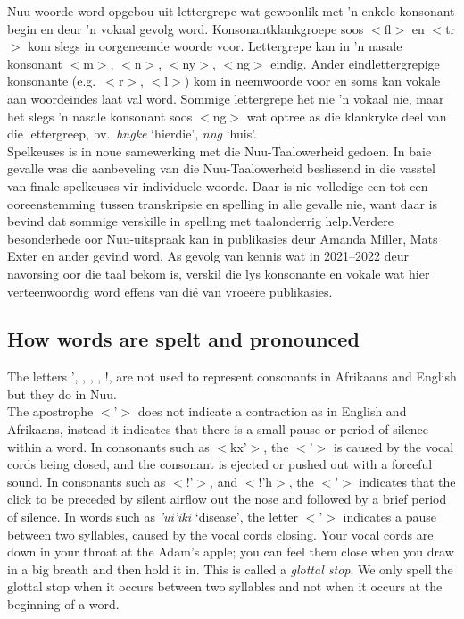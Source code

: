 N\textipa{\textvertline}uu-woorde word opgebou uit lettergrepe wat
gewoonlik met 'n enkele konsonant begin en deur 'n vokaal gevolg
word. Konsonantklankgroepe soos $<$fl$>$ en $<$tr$>$ kom slegs in
oorgeneemde woorde voor. Lettergrepe kan in 'n nasale konsonant
$<$m$>$, $<$n$>$, $<$ny$>$, $<$ng$>$ eindig. Ander eindlettergrepige
konsonante (e.g.\ $<$r$>$, $<$l$>$) kom in neemwoorde voor en soms kan
vokale aan woordeindes laat val word. Sommige lettergrepe het nie 'n
vokaal nie, maar het slegs 'n nasale konsonant soos $<$ng$>$ wat
optree as die klankryke deel van die lettergreep, bv.\ \emph{hngke}
`hierdie', \emph{n\textipa{\textdoublevertline}ng} `huis'.\\

Spelkeuses is in noue samewerking met die
N\textipa{\textvertline}uu-Taalowerheid gedoen. In baie gevalle was
die aanbeveling van die N\textipa{\textvertline}uu-Taalowerheid
beslissend in die vasstel van finale spelkeuses vir individuele
woorde. Daar is nie volledige een-tot-een ooreenstemming tussen
transkripsie en spelling in alle gevalle nie, want daar is bevind dat
sommige verskille in spelling met taalonderrig help.Verdere
besonderhede oor N\textipa{\textvertline}uu-uitspraak kan in
publikasies deur Amanda Miller, Mats Exter en ander gevind word. As
gevolg van kennis wat in 2021--2022 deur navorsing oor die taal bekom
is, verskil die lys konsonante en vokale wat hier verteenwoordig word
effens van di\'{e} van vroe\"{e}re publikasies.


\markboth{}{}
\addtocounter{subsection}{-1}
\tocless\subsection{How words are spelt and pronounced}
{}
\label{s:spelling_e}
\markboth{}{}

The letters ', , \textipa{\textvertline},
\textipa{\textdoublevertline}, !, \textipa{\textdoublebarpipe} are not
used to represent consonants in Afrikaans and English but they do in
N\textipa{\textvertline}uu.\\

The apostrophe $<$'$>$ does not indicate a contraction as in English
and Afrikaans, instead it indicates that there is a small pause or
period of silence within a word. In consonants such as $<$kx'$>$, the
$<$'$>$ is caused by the vocal cords being closed, and the consonant
is ejected or pushed out with a forceful sound. In consonants such as
$<$!'$>$, and $<$!'h$>$, the $<$'$>$ indicates that the click to be
preceded by silent airflow out the nose and followed by a brief period
of silence. In words such as \emph{'ui'iki} `disease',
the letter $<$'$>$ indicates a pause between two syllables, caused by
the vocal cords closing. Your vocal cords are down in your throat at
the Adam's apple; you can feel them close when you draw in a big
breath and then hold it in. This is called a \emph{glottal stop}. We
only spell the glottal stop when it occurs between two syllables and
not when it occurs at the beginning of a word.\\

